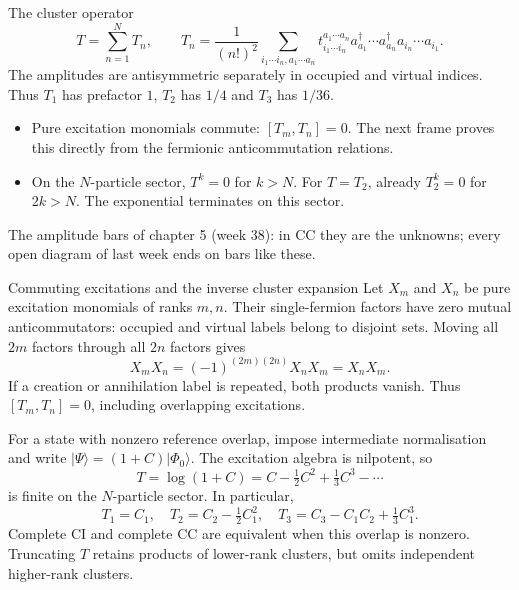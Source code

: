 \documentclass[aspectratio=169,10pt]{beamer}
\newcommand{\ket}[1]{\vert #1\rangle}
\newcommand{\ph}{\Phi_0}
\begin{document}
\begin{frame}[shrink=3]{The cluster operator}
\small
\[
 T=\sum_{n=1}^{N}T_n,\qquad
 T_n=\frac1{(n!)^2}\sum_{i_1\cdots i_n,a_1\cdots a_n}
 t_{i_1\cdots i_n}^{a_1\cdots a_n}
 a_{a_1}^\dagger\cdots a_{a_n}^\dagger a_{i_n}\cdots a_{i_1}.
\]
The amplitudes are antisymmetric separately in occupied and virtual indices. Thus $T_1$ has prefactor $1$, $T_2$ has $1/4$ and $T_3$ has $1/36$.
\begin{itemize}
\item Pure excitation monomials commute: $[T_m,T_n]=0$. The next frame proves this directly from the fermionic anticommutation relations.
\item On the $N$-particle sector, $T^k=0$ for $k>N$. For $T=T_2$, already $T_2^k=0$ for $2k>N$. The exponential terminates on this sector.
\end{itemize}
\begin{center}
\hspace{3em}
\par\small The amplitude bars of chapter 5 (week 38): in CC they are the unknowns; every open diagram of last week ends on bars like these.
\end{center}
\end{frame}

\begin{frame}[shrink=6]{Commuting excitations and the inverse cluster expansion}
Let $X_m$ and $X_n$ be pure excitation monomials of ranks $m,n$. Their single-fermion factors have zero mutual anticommutators: occupied and virtual labels belong to disjoint sets. Moving all $2m$ factors through all $2n$ factors gives
\[
 X_mX_n=(-1)^{(2m)(2n)}X_nX_m=X_nX_m.
\]
If a creation or annihilation label is repeated, both products vanish. Thus $[T_m,T_n]=0$, including overlapping excitations.
\medskip

For a state with nonzero reference overlap, impose intermediate normalisation and write $\ket{\Psi}=(1+C)\ket{\ph}$. The excitation algebra is nilpotent, so
\[
 T=\log(1+C)=C-\tfrac12C^2+\tfrac13C^3-\cdots
\]
is finite on the $N$-particle sector. In particular,
\[
 T_1=C_1,\quad T_2=C_2-\tfrac12C_1^2,\quad
 T_3=C_3-C_1C_2+\tfrac13C_1^3.
\]
Complete CI and complete CC are equivalent when this overlap is nonzero. Truncating $T$ retains products of lower-rank clusters, but omits independent higher-rank clusters.
\end{frame}
\end{document}
